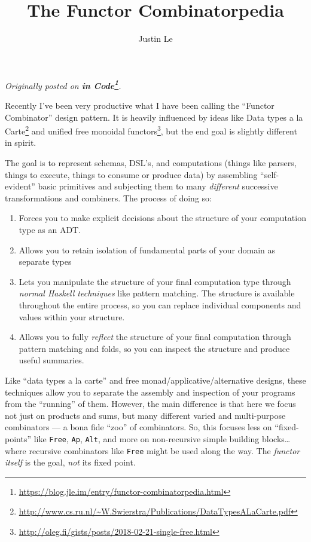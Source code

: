 \documentclass[]{article}
\title{The Functor Combinatorpedia}
\author{Justin Le}
\renewcommand{\href}[2]{#2\footnote{\url{#1}}}
\begin{document}
\maketitle

\emph{Originally posted on
\textbf{\href{https://blog.jle.im/entry/functor-combinatorpedia.html}{in
Code}}.}

Recently I've been very productive what I have been calling the ``Functor
Combinator'' design pattern. It is heavily influenced by ideas like
\href{http://www.cs.ru.nl/~W.Swierstra/Publications/DataTypesALaCarte.pdf}{Data
types a la Carte} and
\href{http://oleg.fi/gists/posts/2018-02-21-single-free.html}{unified free
monoidal functors}, but the end goal is slightly different in spirit.

The goal is to represent schemas, DSL's, and computations (things like parsers,
things to execute, things to consume or produce data) by assembling
``self-evident'' basic primitives and subjecting them to many \emph{different}
successive transformations and combiners. The process of doing so:

\begin{enumerate}
\def\labelenumi{\arabic{enumi}.}
\tightlist
\item
  Forces you to make explicit decisions about the structure of your computation
  type as an ADT.
\item
  Allows you to retain isolation of fundamental parts of your domain as separate
  types
\item
  Lets you manipulate the structure of your final computation type through
  \emph{normal Haskell techniques} like pattern matching. The structure is
  available throughout the entire process, so you can replace individual
  components and values within your structure.
\item
  Allows you to fully \emph{reflect} the structure of your final computation
  through pattern matching and folds, so you can inspect the structure and
  produce useful summaries.
\end{enumerate}

Like ``data types a la carte'' and free monad/applicative/alternative designs,
these techniques allow you to separate the assembly and inspection of your
programs from the ``running'' of them. However, the main difference is that here
we focus not just on products and sums, but many different varied and
multi-purpose combinators --- a bona fide ``zoo'' of combinators. So, this
focuses less on ``fixed-points'' like \texttt{Free}, \texttt{Ap}, \texttt{Alt},
and more on non-recursive simple building blocks\ldots where recursive
combinators like \texttt{Free} might be used along the way. The \emph{functor
itself} is the goal, \emph{not} its fixed point.
\end{document}
